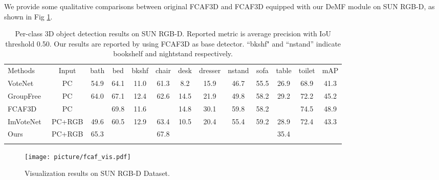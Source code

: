 \documentclass[runningheads]{llncs}
\begin{document}
We provide some qualitative comparisons between original FCAF3D and FCAF3D equipped with our DeMF module on SUN RGB-D, as shown in Fig \ref{fig:vis_fcaf3d}. 



\setlength{\tabcolsep}{1.4pt}
\begin{table}
\renewcommand\arraystretch{1.5}  \scriptsize
\begin{center}
\caption{Per-class  3D  object  detection  results  on  SUN RGB-D. Reported metric is average precision with IoU threshold 0.50. Our results are reported by using FCAF3D as base detector. ``bkshf" and ``nstand'' indicate bookshelf and nightstand respectively.}
\vspace{6pt}
\label{table:per_class_50}
\begin{tabular}{lcccccccccccc}
\Xhline{0.8pt}\noalign{\smallskip}
Methods&Input&bath&bed&bkshf&chair&desk&dresser&nstand&sofa&table&toilet&mAP \\
\noalign{\smallskip}
\hline
\noalign{\smallskip}
VoteNet~\cite{qi2019deep}\footnotemark[1] & PC & 54.9 & 64.1 & 11.0 & 61.3 & 8.2 & 15.9 & 46.7 & 55.5 & 26.9 & 68.9 & 41.3 \\
GroupFree~\cite{liu2021group} & PC & 64.0 & 67.1 & 12.4 & 62.6 & 14.5 & 21.9 & 49.8 & 58.2 & 29.2 & 72.2 & 45.2 \\
FCAF3D~\cite{rukhovich2021fcaf3d} & PC &  & 69.8 & 11.6 &  & 14.8 & 30.1 & 59.8 & 58.2 &  & 74.5 & 48.9 \\
ImVoteNet\cite{qi2020imvotenet}\footnotemark[2] & PC+RGB & 49.6 & 60.5 & 12.9 & 63.4 & 10.5 & 20.4 & 55.4 & 59.2 & 28.9 & 72.4 & 43.3 \\
Ours & PC+RGB & 65.3 &  &  & 67.8 &  &  &  &  & 35.4 &  & \\
\Xhline{0.8pt}
\end{tabular}
\end{center}
\end{table}
\setlength{\tabcolsep}{1.4pt}


\begin{figure}[H]
\centering
\texttt{[image: picture/fcaf\_vis.pdf]}
\caption{Visualization results on SUN RGB-D Dataset.}
\label{fig:vis_fcaf3d}
\end{figure}
\end{document}
